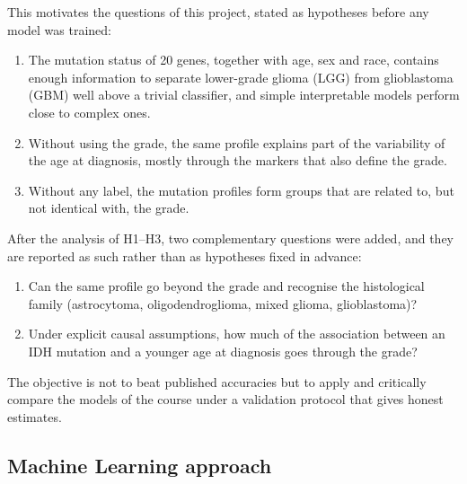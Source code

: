 This motivates the questions of this project, stated as hypotheses before any model was trained:
\begin{enumerate}[label=\textbf{H\arabic*.}, leftmargin=*]
  \item The mutation status of 20 genes, together with age, sex and race, contains enough
        information to separate lower-grade glioma (LGG) from glioblastoma (GBM) well above a trivial
        classifier, and simple interpretable models perform close to complex ones.
  \item Without using the grade, the same profile explains part of the variability of the age at
        diagnosis, mostly through the markers that also define the grade.
  \item Without any label, the mutation profiles form groups that are related to, but not
        identical with, the grade.
\end{enumerate}
After the analysis of H1--H3, two complementary questions were added, and they are reported as such
rather than as hypotheses fixed in advance:
\begin{enumerate}[label=\textbf{Q\arabic*.}, leftmargin=*, start=4]
  \item Can the same profile go beyond the grade and recognise the histological family
        (astrocytoma, oligodendroglioma, mixed glioma, glioblastoma)?
  \item Under explicit causal assumptions, how much of the association between an IDH mutation and a
        younger age at diagnosis goes through the grade?
\end{enumerate}
The objective is not to beat published accuracies but to apply and critically compare the
models of the course under a validation protocol that gives honest estimates.

\subsection{Machine Learning approach}

